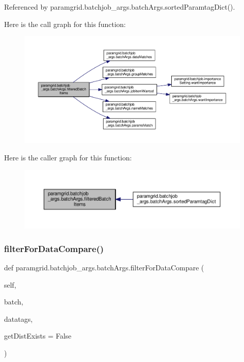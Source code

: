 Referenced by paramgrid.\+batchjob\+\_\+args.\+batch\+Args.\+sorted\+Paramtag\+Dict().

Here is the call graph for this function\+:
\nopagebreak
\begin{figure}[H]
\begin{center}
\leavevmode
\includegraphics[width=350pt]{classparamgrid_1_1batchjob__args_1_1batchArgs_a1367a161802a65eaeba85b94b487943e_cgraph}
\end{center}
\end{figure}
Here is the caller graph for this function\+:
\nopagebreak
\begin{figure}[H]
\begin{center}
\leavevmode
\includegraphics[width=350pt]{classparamgrid_1_1batchjob__args_1_1batchArgs_a1367a161802a65eaeba85b94b487943e_icgraph}
\end{center}
\end{figure}
\mbox{\label{classparamgrid_1_1batchjob__args_1_1batchArgs_ad84b8f825a979fdfae36954030815ba6}} 
\subsubsection{\texorpdfstring{filter\+For\+Data\+Compare()}{filterForDataCompare()}}
{\footnotesize\ttfamily def paramgrid.\+batchjob\+\_\+args.\+batch\+Args.\+filter\+For\+Data\+Compare (\begin{DoxyParamCaption}\item[{}]{self,  }\item[{}]{batch,  }\item[{}]{datatags,  }\item[{}]{get\+Dist\+Exists = {\ttfamily False} }\end{DoxyParamCaption})}



